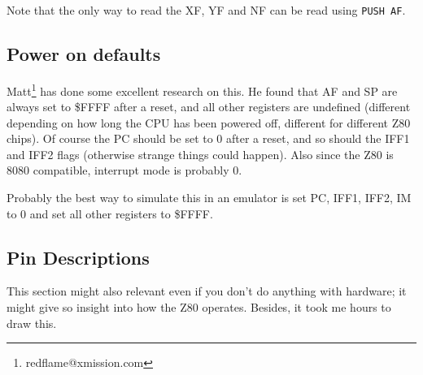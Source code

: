 \documentclass[12pt,twoside,openright,a4paper]{book}
\begin{document}
Note that the only way to read the XF, YF and NF can be read using
{\tt PUSH AF}.


\subsection{Power on defaults}
\label{pon}

Matt\footnote{redflame@xmission.com} has done some excellent research on this. He found that AF and SP are always set to \$FFFF after a reset, and all other registers are undefined (different depending on how long the CPU has been powered off, different for different Z80 chips). Of course the PC should be set to 0 after a reset, and so should the IFF1 and IFF2 flags (otherwise strange things could happen). Also since the Z80 is 8080 compatible, interrupt mode is probably 0.

Probably the best way to simulate this in an emulator is set PC, IFF1, IFF2, IM to 0 and set all other registers to \$FFFF.


\subsection{Pin Descriptions \cite{datasheet}}

This section might also relevant even if you don't do anything with hardware; it might give so insight into how the Z80 operates. Besides, it took me hours to draw this.
\end{document}
